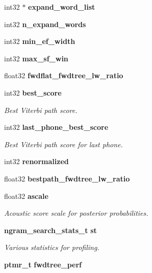 \begin{DoxyCompactItemize}
\item 
int32 $\ast$ {\bfseries expand\-\_\-word\-\_\-list}\label{structngram__search__s_a4fadd755f8823c07dc5ab52f1b6d403d}

\item 
int32 {\bfseries n\-\_\-expand\-\_\-words}\label{structngram__search__s_a8a9999b6557b7c98dc03191a2d117eae}

\item 
int32 {\bfseries min\-\_\-ef\-\_\-width}\label{structngram__search__s_a88877b4dc14e04a6545c89668d8fcffc}

\item 
int32 {\bfseries max\-\_\-sf\-\_\-win}\label{structngram__search__s_a40659238fc506f7a3205eb080837008a}

\item 
float32 {\bfseries fwdflat\-\_\-fwdtree\-\_\-lw\-\_\-ratio}\label{structngram__search__s_a5772dec76068e162cebbae9f0f474aa6}

\item 
int32 {\bf best\-\_\-score}
\begin{DoxyCompactList}\small\item\em Best Viterbi path score. \end{DoxyCompactList}\item 
int32 {\bf last\-\_\-phone\-\_\-best\-\_\-score}
\begin{DoxyCompactList}\small\item\em Best Viterbi path score for last phone. \end{DoxyCompactList}\item 
int32 {\bfseries renormalized}\label{structngram__search__s_abf5988b55e39ff07d65edf61086a69da}

\item 
float32 {\bfseries bestpath\-\_\-fwdtree\-\_\-lw\-\_\-ratio}\label{structngram__search__s_a99114235f6ae8bc6d7c5849465499633}

\item 
float32 {\bf ascale}
\begin{DoxyCompactList}\small\item\em Acoustic score scale for posterior probabilities. \end{DoxyCompactList}\item 
{\bf ngram\-\_\-search\-\_\-stats\-\_\-t} {\bf st}
\begin{DoxyCompactList}\small\item\em Various statistics for profiling. \end{DoxyCompactList}\item 
{\bf ptmr\-\_\-t} {\bfseries fwdtree\-\_\-perf}\label{structngram__search__s_af51ec91c4ea052252542a4ec395484d7}


\end{DoxyCompactItemize}
